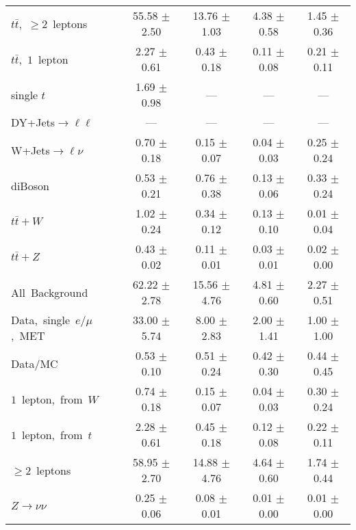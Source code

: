 \documentclass{article}
\begin{document}
\begin{longtable}{|l|c|c|c|c|}
$t\bar{t}$,~$\ge2$~leptons & 55.58 $\pm$ 2.50  & 13.76 $\pm$ 1.03  & 4.38 $\pm$ 0.58  & 1.45 $\pm$ 0.36 \\* 
$t\bar{t}$,~$1$~lepton & 2.27 $\pm$ 0.61  & 0.43 $\pm$ 0.18  & 0.11 $\pm$ 0.08  & 0.21 $\pm$ 0.11 \\* 
single $t$  & 1.69 $\pm$ 0.98  & ---  & ---  & --- \\* 
DY+Jets$\rightarrow\ell\ell$  & ---  & ---  & ---  & --- \\* 
W+Jets$\rightarrow\ell\nu$  & 0.70 $\pm$ 0.18  & 0.15 $\pm$ 0.07  & 0.04 $\pm$ 0.03  & 0.25 $\pm$ 0.24 \\* 
diBoson  & 0.53 $\pm$ 0.21  & 0.76 $\pm$ 0.38  & 0.13 $\pm$ 0.06  & 0.33 $\pm$ 0.24 \\* 
$t\bar{t}+W$  & 1.02 $\pm$ 0.24  & 0.34 $\pm$ 0.12  & 0.13 $\pm$ 0.10  & 0.01 $\pm$ 0.04 \\* 
$t\bar{t}+Z$  & 0.43 $\pm$ 0.02  & 0.11 $\pm$ 0.01  & 0.03 $\pm$ 0.01  & 0.02 $\pm$ 0.00 \\* 
\hline \hline 
All~Background  & 62.22 $\pm$ 2.78  & 15.56 $\pm$ 4.76  & 4.81 $\pm$ 0.60  & 2.27 $\pm$ 0.51 \\* 
Data,~single~$e/\mu$,~MET  & 33.00 $\pm$ 5.74  & 8.00 $\pm$ 2.83  & 2.00 $\pm$ 1.41  & 1.00 $\pm$ 1.00 \\* 
Data/MC  & 0.53 $\pm$ 0.10  & 0.51 $\pm$ 0.24  & 0.42 $\pm$ 0.30  & 0.44 $\pm$ 0.45 \\* 
\hline \hline 
$1$~lepton,~from~$W$  & 0.74 $\pm$ 0.18  & 0.15 $\pm$ 0.07  & 0.04 $\pm$ 0.03  & 0.30 $\pm$ 0.24 \\* 
$1$~lepton,~from~$t$  & 2.28 $\pm$ 0.61  & 0.45 $\pm$ 0.18  & 0.12 $\pm$ 0.08  & 0.22 $\pm$ 0.11 \\* 
$\ge2$~leptons  & 58.95 $\pm$ 2.70  & 14.88 $\pm$ 4.76  & 4.64 $\pm$ 0.60  & 1.74 $\pm$ 0.44 \\* 
$Z\rightarrow\nu\nu$  & 0.25 $\pm$ 0.06  & 0.08 $\pm$ 0.01  & 0.01 $\pm$ 0.00  & 0.01 $\pm$ 0.00 \\* 
\hline 
\end{longtable} 

 
 
 
 
\pagebreak 

 
 
 
 
\end{document}
